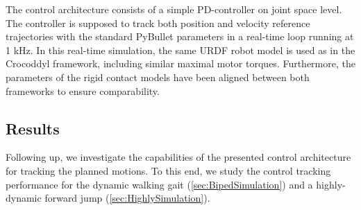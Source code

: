 The control architecture consists of a simple PD-controller on joint space level. The controller is supposed to track both position and velocity reference trajectories with the standard PyBullet parameters in a real-time loop running at 1 kHz. In this real-time simulation, the same URDF robot model is used as in the Crocoddyl framework, including similar maximal motor torques. Furthermore, the parameters of the rigid contact models have been aligned between both frameworks to ensure comparability.

\subsection{Results}
Following up, we investigate the capabilities of the presented control architecture for tracking the planned motions. To this end, we study the control tracking performance for the dynamic walking gait (\cref{sec:BipedSimulation}) and a highly-dynamic forward jump (\cref{sec:HighlySimulation}).

